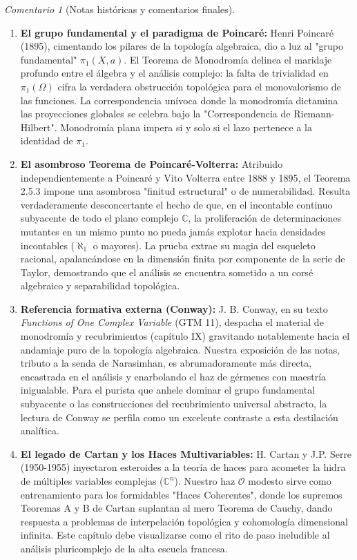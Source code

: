 \documentclass[11pt,a4paper]{article}
\theoremstyle{definition}
\theoremstyle{remark}
\newtheorem{observacion}{Comentario}[section]
\numberwithin{equation}{section}
\begin{document}
\begin{observacion}[Notas históricas y comentarios finales]
\begin{enumerate}
    \item \textbf{El grupo fundamental y el paradigma de Poincaré:} Henri Poincaré (1895), cimentando los pilares de la topología algebraica, dio a luz al "grupo fundamental" $\pi_1(X, a)$. El Teorema de Monodromía delinea el maridaje profundo entre el álgebra y el análisis complejo: la falta de trivialidad en $\pi_1(\Omega)$ cifra la verdadera obstrucción topológica para el monovalorismo de las funciones. La correspondencia unívoca donde la monodromía dictamina las proyecciones globales se celebra bajo la "Correspondencia de Riemann-Hilbert". Monodromía plana impera si y solo si el lazo pertenece a la identidad de $\pi_1$.
    
    \item \textbf{El asombroso Teorema de Poincaré-Volterra:} Atribuido independientemente a Poincaré y Vito Volterra entre 1888 y 1895, el Teorema 2.5.3 impone una asombrosa "finitud estructural" o de numerabilidad. Resulta verdaderamente desconcertante el hecho de que, en el incontable continuo subyacente de todo el plano complejo $\mathbb{C}$, la proliferación de determinaciones mutantes en un mismo punto no pueda jamás explotar hacia densidades incontables ($\aleph_1$ o mayores). La prueba extrae su magia del esqueleto racional, apalancándose en la dimensión finita por componente de la serie de Taylor, demostrando que el análisis se encuentra sometido a un corsé algebraico y separabilidad topológica.
    
    \item \textbf{Referencia formativa externa (Conway):} J. B. Conway, en su texto \textit{Functions of One Complex Variable} (GTM 11), despacha el material de monodromía y recubrimientos (capítulo IX) gravitando notablemente hacia el andamiaje puro de la topología algebraica. Nuestra exposición de las notas, tributo a la senda de Narasimhan, es abrumadoramente más directa, encastrada en el análisis y enarbolando el haz de gérmenes con maestría inigualable. Para el purista que anhele dominar el grupo fundamental subyacente o las construcciones del recubrimiento universal abstracto, la lectura de Conway se perfila como un excelente contraste a esta destilación analítica.
    
    \item \textbf{El legado de Cartan y los Haces Multivariables:} H. Cartan y J.P. Serre (1950-1955) inyectaron esteroides a la teoría de haces para acometer la hidra de múltiples variables complejas ($\mathbb{C}^n$). Nuestro haz $\mathcal{O}$ modesto sirve como entrenamiento para los formidables "Haces Coherentes", donde los supremos Teoremas A y B de Cartan suplantan al mero Teorema de Cauchy, dando respuesta a problemas de interpelación topológica y cohomología dimensional infinita. Este capítulo debe visualizarse como el rito de paso ineludible al análisis pluricomplejo de la alta escuela francesa.
\end{enumerate}
\end{observacion}
\end{document}
